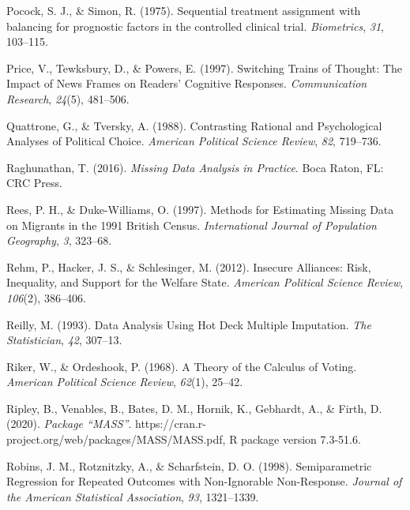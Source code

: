\documentclass[12pt,econ]{sources/authesis}
\begin{document}
\leavevmode\hypertarget{ref-pocock_1975_sequential}{}%
Pocock, S. J., \& Simon, R. (1975). Sequential treatment assignment with balancing for prognostic factors in the controlled clinical trial. \emph{Biometrics}, \emph{31}, 103--115.

\leavevmode\hypertarget{ref-price_switching_1997}{}%
Price, V., Tewksbury, D., \& Powers, E. (1997). Switching Trains of Thought: The Impact of News Frames on Readers' Cognitive Responses. \emph{Communication Research}, \emph{24}(5), 481--506.

\leavevmode\hypertarget{ref-quattrone_1988_contrasting}{}%
Quattrone, G., \& Tversky, A. (1988). Contrasting Rational and Psychological Analyses of Political Choice. \emph{American Political Science Review}, \emph{82}, 719--736.

\leavevmode\hypertarget{ref-raghunathan_2016_missing}{}%
Raghunathan, T. (2016). \emph{Missing Data Analysis in Practice}. Boca Raton, FL: CRC Press.

\leavevmode\hypertarget{ref-rees_1997_methods}{}%
Rees, P. H., \& Duke-Williams, O. (1997). Methods for Estimating Missing Data on Migrants in the 1991 British Census. \emph{International Journal of Population Geography}, \emph{3}, 323--68.

\leavevmode\hypertarget{ref-rehm_2012_insecure}{}%
Rehm, P., Hacker, J. S., \& Schlesinger, M. (2012). Insecure Alliances: Risk, Inequality, and Support for the Welfare State. \emph{American Political Science Review}, \emph{106}(2), 386--406.

\leavevmode\hypertarget{ref-reilly_1993_data}{}%
Reilly, M. (1993). Data Analysis Using Hot Deck Multiple Imputation. \emph{The Statistician}, \emph{42}, 307--13.

\leavevmode\hypertarget{ref-riker_theory_1968}{}%
Riker, W., \& Ordeshook, P. (1968). A Theory of the Calculus of Voting. \emph{American Political Science Review}, \emph{62}(1), 25--42.

\leavevmode\hypertarget{ref-ripley_2020_package}{}%
Ripley, B., Venables, B., Bates, D. M., Hornik, K., Gebhardt, A., \& Firth, D. (2020). \emph{Package ``MASS''}. https://cran.r-project.org/web/packages/MASS/MASS.pdf, R package version 7.3-51.6.

\leavevmode\hypertarget{ref-robins_1998_semiparametric}{}%
Robins, J. M., Rotznitzky, A., \& Scharfstein, D. O. (1998). Semiparametric Regression for Repeated Outcomes with Non-Ignorable Non-Response. \emph{Journal of the American Statistical Association}, \emph{93}, 1321--1339.
\end{document}
